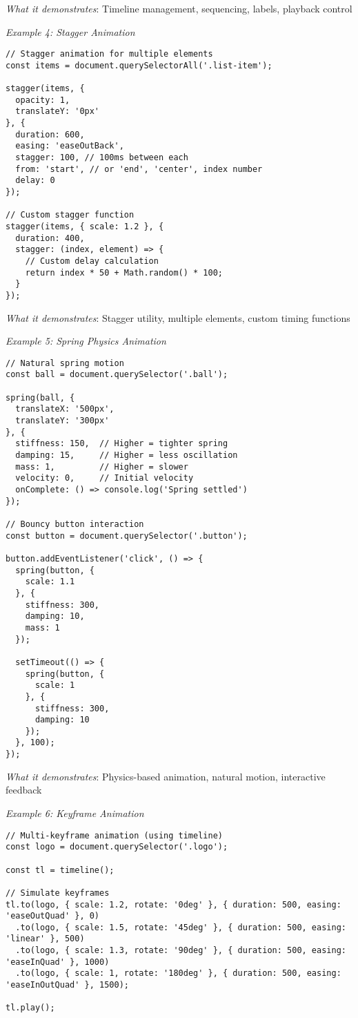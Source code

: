 \documentclass[11pt]{article}
\begin{document}
\emph{What it demonstrates}: Timeline management, sequencing, labels, playback control

\emph{Example 4: Stagger Animation}

\begin{verbatim}
// Stagger animation for multiple elements
const items = document.querySelectorAll('.list-item');

stagger(items, {
  opacity: 1,
  translateY: '0px'
}, {
  duration: 600,
  easing: 'easeOutBack',
  stagger: 100, // 100ms between each
  from: 'start', // or 'end', 'center', index number
  delay: 0
});

// Custom stagger function
stagger(items, { scale: 1.2 }, {
  duration: 400,
  stagger: (index, element) => {
    // Custom delay calculation
    return index * 50 + Math.random() * 100;
  }
});
\end{verbatim}

\emph{What it demonstrates}: Stagger utility, multiple elements, custom timing functions

\emph{Example 5: Spring Physics Animation}

\begin{verbatim}
// Natural spring motion
const ball = document.querySelector('.ball');

spring(ball, {
  translateX: '500px',
  translateY: '300px'
}, {
  stiffness: 150,  // Higher = tighter spring
  damping: 15,     // Higher = less oscillation
  mass: 1,         // Higher = slower
  velocity: 0,     // Initial velocity
  onComplete: () => console.log('Spring settled')
});

// Bouncy button interaction
const button = document.querySelector('.button');

button.addEventListener('click', () => {
  spring(button, {
    scale: 1.1
  }, {
    stiffness: 300,
    damping: 10,
    mass: 1
  });
  
  setTimeout(() => {
    spring(button, {
      scale: 1
    }, {
      stiffness: 300,
      damping: 10
    });
  }, 100);
});
\end{verbatim}

\emph{What it demonstrates}: Physics-based animation, natural motion, interactive feedback

\emph{Example 6: Keyframe Animation}

\begin{verbatim}
// Multi-keyframe animation (using timeline)
const logo = document.querySelector('.logo');

const tl = timeline();

// Simulate keyframes
tl.to(logo, { scale: 1.2, rotate: '0deg' }, { duration: 500, easing: 'easeOutQuad' }, 0)
  .to(logo, { scale: 1.5, rotate: '45deg' }, { duration: 500, easing: 'linear' }, 500)
  .to(logo, { scale: 1.3, rotate: '90deg' }, { duration: 500, easing: 'easeInQuad' }, 1000)
  .to(logo, { scale: 1, rotate: '180deg' }, { duration: 500, easing: 'easeInOutQuad' }, 1500);

tl.play();
\end{verbatim}
\end{document}
